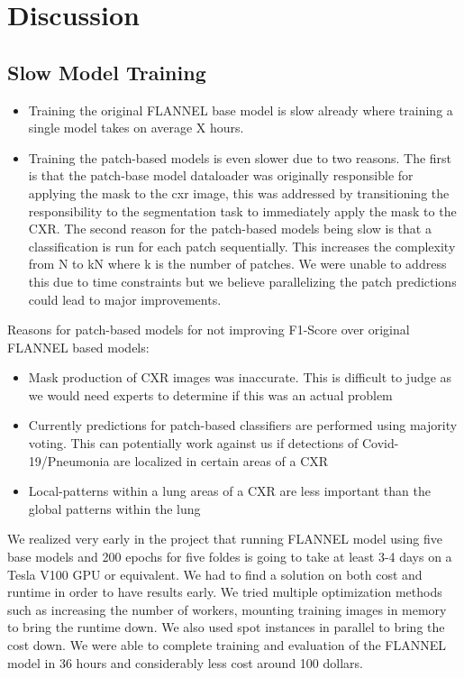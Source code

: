 \documentclass{sigkddExp}
\begin{document}
\section{Discussion}

\subsection{Slow Model Training}
\begin{itemize}
    \item Training the original FLANNEL base model is slow already where
          training a single model takes on average X hours.
    \item Training the patch-based models is even slower due to two reasons. The
          first is that the patch-base model dataloader was originally responsible for
          applying the mask to the cxr image, this was addressed by transitioning the
          responsibility to the segmentation task to immediately apply the mask to the
          CXR. The second reason for the patch-based models being slow is that a
          classification is run for each patch sequentially. This increases the
          complexity from N to kN where k is the number of patches. We were unable to
          address this due to time constraints but we believe parallelizing the patch
          predictions could lead to major improvements.
\end{itemize}

Reasons for patch-based models for not improving F1-Score over original FLANNEL based models:
\begin{itemize}
    \item Mask production of CXR images was inaccurate. This is difficult to
          judge as we would need experts to determine if this was an actual problem
    \item Currently predictions for patch-based classifiers are performed using
          majority voting. This can potentially work against us if detections of
          Covid-19/Pneumonia are localized in certain areas of a CXR
    \item Local-patterns within a lung areas of a CXR are less important than
          the global patterns within the lung
\end{itemize}


We realized very early in the project that running FLANNEL model using five base
models and 200 epochs for five foldes is going to take at least 3-4 days on a
Tesla V100 GPU or equivalent. We had to find a solution on both cost and runtime
in order to have results early. We tried multiple optimization methods such as
increasing the number of workers, mounting training images in memory to bring
the runtime down. We also used spot instances in parallel to bring the cost
down. We were able to complete training and evaluation of the FLANNEL model in
36 hours and considerably less cost around 100 dollars.
\end{document}
